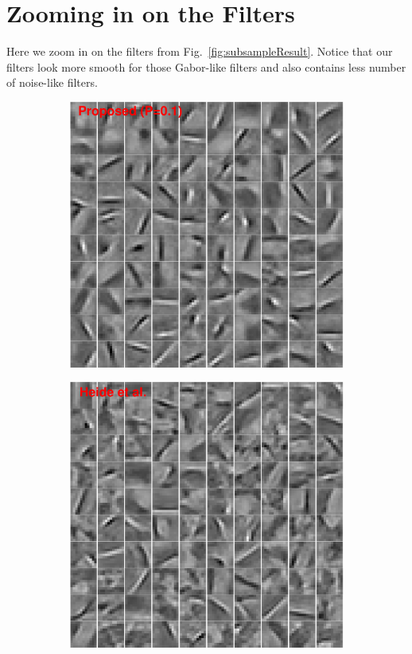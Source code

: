 \section{Zooming in on the Filters}

Here we zoom in on the filters from Fig.\ \ref{fig:subsampleResult}. Notice that our filters look more smooth for those Gabor-like filters and also contains less number of noise-like filters.

\begin{figure}[h]
\centering
\begin{subfigure}{0.49\textwidth}
  \includegraphics[width=1\linewidth]{figure/batchFruit100.pdf}
\end{subfigure}
\begin{subfigure}{0.49\textwidth}
  \includegraphics[width=1\linewidth]{figure/heideFruit100.pdf}

\end{subfigure}
\end{figure}
